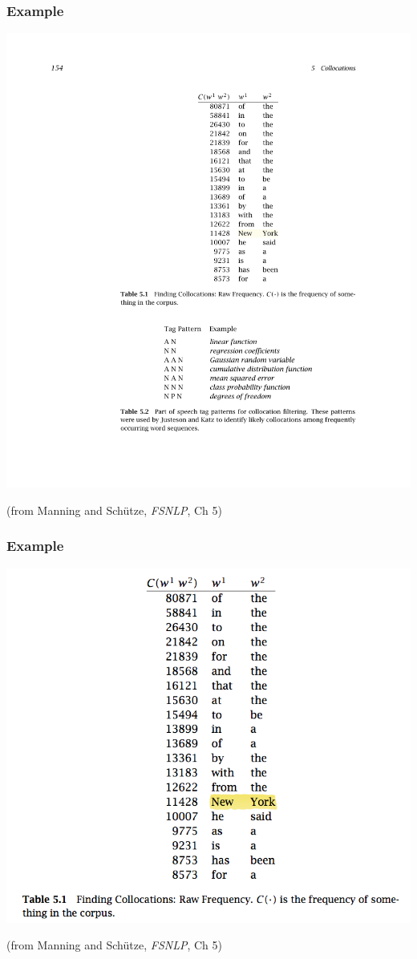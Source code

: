 \documentclass[11pt,handout]{beamer}
\begin{document}
\begin{frame}
 \frametitle{Example}
 \begin{center}
  \includegraphics[height=.8\textheight]{MStable51.pdf}

  \footnotesize (from Manning and Sch\"utze, \emph{FSNLP}, Ch 5)
 \end{center}
\end{frame}

\begin{frame}
 \frametitle{Example}
 \begin{center}
  \includegraphics[height=.8\textheight]{MStable51b.png}

  \footnotesize (from Manning and Sch\"utze, \emph{FSNLP}, Ch 5)
 \end{center}
\end{frame}
\end{document}

